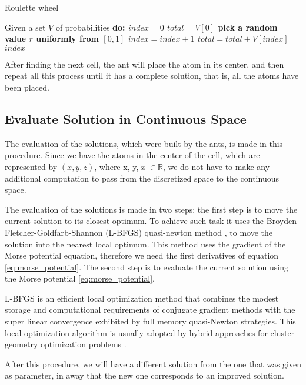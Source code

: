 			\begin{algorithm}
				\caption{Roulette wheel}
				\label{alg:roulette_wheel}
				\begin{algorithmic}
				\STATE Given a set $V$ of probabilities \bf{do}:
				\STATE $index = 0$
				\STATE $total = V[0]$
				\STATE pick a random value $r$ uniformly from $[0,1]$
					\STATE $index = index + 1$
					\STATE $total = total + V[index]$		
				\ENDWHILE
				\RETURN $index$
				\end{algorithmic}
			\end{algorithm}
			
			After finding the next cell, the ant will place the atom in its center, and then repeat all this process until it has a complete solution, that is, all the atoms have been placed.
			
			\subsection{Evaluate Solution in Continuous Space}
			
			The evaluation of the solutions, which were built by the ants, is made in this procedure. Since we have the atoms in the center of the cell, which are represented by $(x,y,z)$, where x, y, z $\in \mathbb{R}$, we do not have to make any additional computation to pass from the discretized space to the continuous space.

			The evaluation of the solutions is made in two steps: the first step is to move the current solution to its closest optimum. To achieve such task it uses the Broyden-Fletcher-Goldfarb-Shannon (L-BFGS) quasi-newton method \cite{liu89}, to move the solution into the nearest local optimum. This method uses the gradient of the Morse potential equation, therefore we need the first derivatives of equation \ref{eq:morse_potential}. The second step is to evaluate the current solution using the Morse potential \ref{eq:morse_potential}.

			L-BFGS is an efficient local optimization method that combines the modest storage and computational requirements of conjugate gradient methods with the super linear convergence exhibited by full memory quasi-Newton strategies. This local optimization algorithm is usually adopted by hybrid approaches for cluster geometry optimization problems \cite{grosso07, xico09}.

			After this procedure, we will have a different solution from the one that was given as parameter, in away that the new one corresponds to an improved solution.
			
